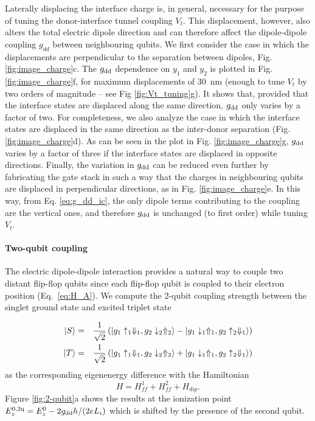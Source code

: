 Laterally displacing the interface charge is, in general, necessary for the purpose of tuning the donor-interface tunnel coupling $V_t$. This displacement, however, also alters the total electric dipole direction and can therefore affect the dipole-dipole coupling $g_{dd}$ between neighbouring qubits. We first consider the case in which the displacements are perpendicular to the separation between dipoles,  Fig. \ref{fig:image_charge}c. The $g_{\rm dd}$ dependence on $y_1$ and $y_2$ is plotted in Fig. \ref{fig:image_charge}f, for maximum displacements of 30~nm (enough to tune $V_t$ by two orders of magnitude -- see Fig \ref{fig:Vt_tuning}g). It shows that, provided that the interface states are displaced along the same direction, $g_{\rm dd}$ only varies by a factor of two. For completeness, we also analyze the case in which the interface states are displaced in the same direction as the inter-donor separation (Fig. \ref{fig:image_charge}d). As can be seen in the plot in Fig. \ref{fig:image_charge}g, $g_{\rm dd}$ varies by a factor of three if the interface states are displaced in opposite directions. Finally, the variation in $g_{\rm dd}$ can be reduced even further by fabricating the gate stack in such a way that the charges in neighbouring qubits are displaced in perpendicular directions, as in Fig. \ref{fig:image_charge}e. In this way, from Eq. \ref{eq:g_dd_ic}, the only dipole terms contributing to the coupling are the vertical ones, and therefore $g_{\rm dd}$ is unchanged (to first order) while tuning $V_t$.

\paragraph{Two-qubit coupling}
The electric dipole-dipole interaction provides a natural way to couple two distant flip-flop qubits since each flip-flop qubit is coupled to their electron position (Eq.~\ref{eq:H_A}). We compute the 2-qubit coupling strength between the singlet ground state and excited triplet state

\begin{eqnarray}
|S\rangle&=&\frac{1}{\sqrt{2}}\left(|g_1\uparrow_1\Downarrow_1, g_2\downarrow_2\Uparrow_2\rangle-|g_1\downarrow_1\Uparrow_1, g_2 \uparrow_2\Downarrow_1\rangle\right)\\
|T\rangle&=&\frac{1}{\sqrt{2}}\left(|g_1\uparrow_1\Downarrow_1, g_2\downarrow_2\Uparrow_2\rangle+|g_1\downarrow_1\Uparrow_1, g_2 \uparrow_2\Downarrow_1\rangle\right)
\end{eqnarray}
as the corresponding eigenenergy difference with the Hamiltonian
\begin{equation}
H=H_{ff}^1+H_{ff}^2+H_{dip}.
\end{equation}
 Figure \ref{fig:2-qubit}a shows the results at the ionization point $E_z^{\rm 0,2q}=E_z^0-2g_{\rm dd}h/(2eL_i)$ which is shifted by the presence of the second qubit. 

